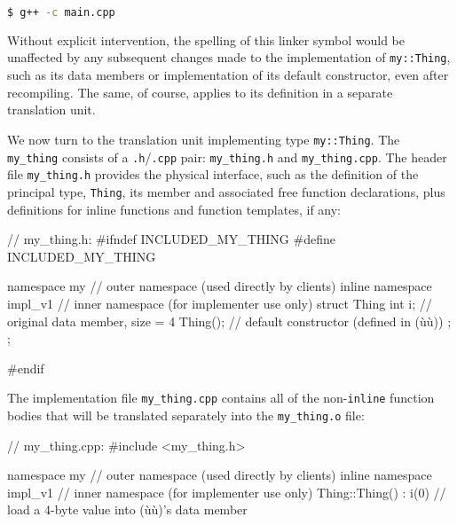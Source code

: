 \begin{lstlisting}[language=bash,style=plain]
$ g++ -c main.cpp
\end{lstlisting}

\noindent Without explicit intervention, the spelling of this linker symbol would
be unaffected by any subsequent changes made to the implementation of
\lstinline!my::Thing!, such as its data members or implementation of its
default constructor, even after recompiling. The same, of course,
applies to its definition in a separate translation unit.

We now turn to the translation unit implementing type
\lstinline!my::Thing!. The \lstinline!my_thing!  consists
of a \lstinline!.h!/\lstinline!.cpp! pair: \lstinline!my_thing.h! and
\lstinline!my_thing.cpp!. The header file \lstinline!my_thing.h! provides
the physical interface, such as the definition of the principal type,
\lstinline!Thing!, its member and associated free function declarations,
plus definitions for inline functions and function templates, if any:

\begin{emcppslisting}[emcppsbatch=e4]
// my_thing.h:
#ifndef INCLUDED_MY_THING
#define INCLUDED_MY_THING

namespace my                  // outer namespace (used directly by clients)
{
    inline namespace impl_v1  // inner namespace (for implementer use only)
    {
        struct Thing
        {
            int i;    // original data member, size = 4
            Thing();  // default constructor (defined in (ù{}ù))
        };
    };
}

#endif
\end{emcppslisting}

\noindent The implementation file \lstinline!my_thing.cpp! contains all of the
non-\lstinline!inline! function bodies that will be translated separately
into the \lstinline!my_thing.o! file:

\begin{emcppslisting}[emcppsbatch=e4]
// my_thing.cpp:
#include <my_thing.h>

namespace my                   // outer namespace (used directly by clients)
{
    inline namespace impl_v1   // inner namespace (for implementer use only)
    {
        Thing::Thing() : i(0)  // load a 4-byte value into (ù{}ù)'s data member
        {
        }
    }
}
\end{emcppslisting}

